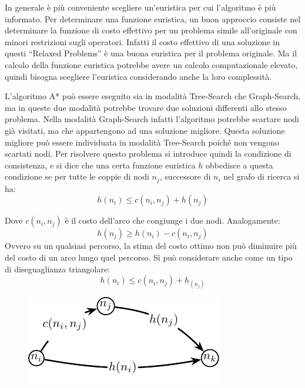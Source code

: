 \documentclass{article}
\numberwithin{equation}{subsection}
\begin{document}
In generale è più conveniente scegliere un'euristica per cui l'algoritmo è più informato. Per determinare una funzione euristica, un buon approccio consiste nel 
determinare la funzione di costo effettivo per un problema simile all'originale con minori restrizioni sugli operatori. Infatti il costo effettivo di una soluzione 
in questi ``Relaxed Problems'' è una buona euristica per il problema originale. Ma il calcolo della funzione euristica potrebbe avere un calcolo computazionale 
elevato, quindi bisogna scegliere l'euristica considerando anche la loro complessità.  

L'algoritmo A* può essere eseguito sia in modalità Tree-Search che Graph-Search, ma in queste due modalità potrebbe trovare due soluzioni differenti allo stesso 
problema. 
Nella modalità Graph-Search infatti l'algoritmo potrebbe scartare nodi già visitati, ma che appartengono ad una soluzione migliore. Questa soluzione migliore può essere individuata in modalità Tree-Search poiché non 
vengono scartati nodi. Per risolvere questo problema si introduce quindi la condizione di consistenza, e si dice che una certa funzione euristica $h$ 
obbedisce a questa condizione se per tutte le coppie di nodi $n_j$, successore di $n_i$ nel grafo di 
ricerca si ha:
\begin{equation}
    h(n_i)\leq c(n_i,n_j)+h(n_j)
\end{equation}

Dove $c(n_i,n_j)$ è il costo dell'arco che congiunge i due nodi. 
Analogamente:
\begin{equation*}
    h(n_j)\geq h(n_i)-c(n_i,n_j)
\end{equation*}
Ovvero su un qualsiasi percorso, la stima del costo ottimo non può diminuire più del costo di un arco 
lungo quel percorso. Si può considerare anche come un tipo di diseguaglianza triangolare:
\begin{equation*}
    h(n_i)\leq c(n_i,n_j)+h_(n_j)
\end{equation*}

\begin{figure}[H]
    \centering%
    \includegraphics{disuguaglianza_consistenza.pdf}%
\end{figure}
\end{document}
